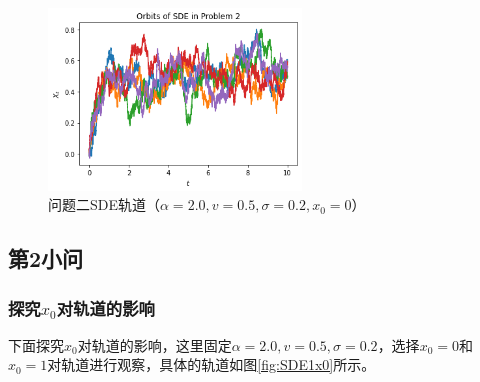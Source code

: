 \documentclass{article}
\begin{document}
\begin{figure}[H]
\centering
\includegraphics[width=0.6\textwidth]{figures/SDE1 Orbit1.png}
\caption{\label{fig:SDE1}问题二SDE轨道（$\alpha = 2.0, v = 0.5, \sigma = 0.2, x_0 = 0 $）}
\end{figure}

\subsection{第2小问}

\subsubsection{探究$x_0$对轨道的影响}

下面探究$x_0$对轨道的影响，这里固定$\alpha = 2.0, v = 0.5, \sigma = 0.2$，选择$x_0 = 0$和$x_0 = 1$对轨道进行观察，具体的轨道如图\ref{fig:SDE1x0}所示。 
\end{document}
